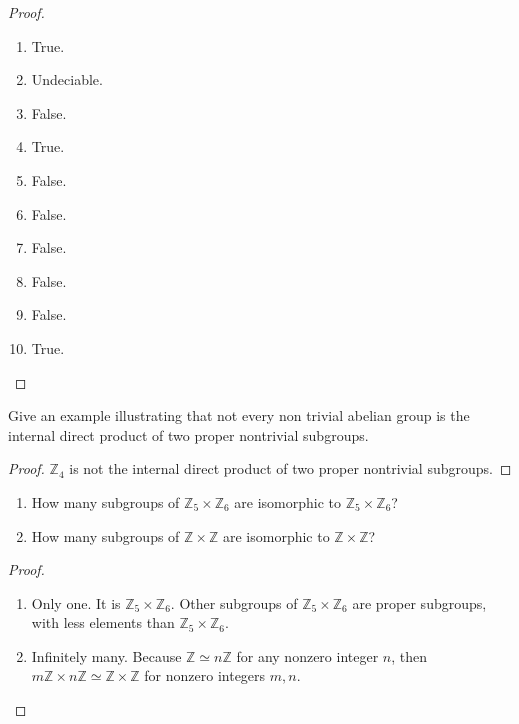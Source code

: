 \begin{proof}
    \begin{enumerate}[label={\textbf{\alph*.}}]
        \item True.
        \item Undeciable.
        \item False.
        \item True.
        \item False.
        \item False.
        \item False.
        \item False.
        \item False.
        \item True.
    \end{enumerate}
\end{proof}

\begin{exercise}
    Give an example illustrating that not every non trivial abelian group is the internal direct product of two proper nontrivial subgroups.
\end{exercise}

\begin{proof}
    $\mathbb{Z}_{4}$ is not the internal direct product of two proper nontrivial subgroups.
\end{proof}

\begin{exercise}
    \begin{enumerate}
        \item How many subgroups of $\mathbb{Z}_{5} \times \mathbb{Z}_{6}$ are isomorphic to $\mathbb{Z}_{5} \times \mathbb{Z}_{6}$?
        \item How many subgroups of $\mathbb{Z} \times \mathbb{Z}$ are isomorphic to $\mathbb{Z}\times \mathbb{Z}$?
    \end{enumerate}
\end{exercise}

\begin{proof}
    \begin{enumerate}
        \item Only one. It is $\mathbb{Z}_{5}\times\mathbb{Z}_{6}$. Other subgroups of $\mathbb{Z}_{5}\times\mathbb{Z}_{6}$ are proper subgroups, with less elements than $\mathbb{Z}_{5}\times\mathbb{Z}_{6}$.
        \item Infinitely many. Because $\mathbb{Z}\simeq n\mathbb{Z}$ for any nonzero integer $n$, then $m\mathbb{Z} \times n\mathbb{Z} \simeq \mathbb{Z}\times\mathbb{Z}$ for nonzero integers $m, n$.
    \end{enumerate}
\end{proof}

